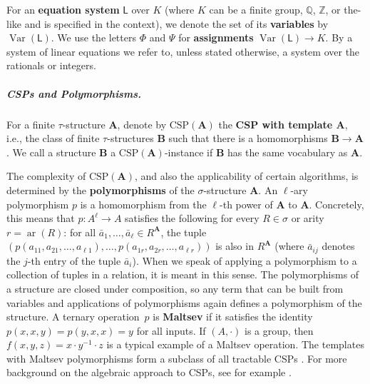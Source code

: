 \documentclass[a4paper,english, thm-restate]{lipics-v2021}
\newcommand{\ZZ}{\mathbb{Z}}
\newcommand{\QQ}{\mathbb{Q}}
\newcommand{\defining}[1]{\textbf{#1}}
\newcommand{\sig}{\tau}
\newcommand{\arity}[1]{\operatorname*{ar}(#1)}
\newcommand{\StructA}{\mathbf{A}}
\newcommand{\StructB}{\mathbf{B}}
\newcommand{\CSP}[1]{\mathrm{CSP}(#1)}
\newcommand{\leqs}{\mathsf{L}}
\newcommand{\Var}[1]{\operatorname*{Var}(#1)}
\begin{document}
	For an \defining{equation system} $\leqs$ over $K$ (where $K$ can be a finite group, $\QQ$, $\ZZ$, or the-like and is specified in the context),
	we denote the set of its \defining{variables} by $\Var{\leqs}$.
	We use the letters $\Phi$ and $\Psi$
	for \defining{assignments} $\Var{\leqs} \to K$.
	By a system of linear equations we refer to,
	unless stated otherwise,
	a system over the rationals or integers.
	
	
	
	
	
	\subparagraph{CSPs and Polymorphisms.}
	For a finite $\sig$-structure $\StructA$, denote by $\CSP{\StructA}$
	the \defining{CSP with template $\StructA$}, i.e., the class of finite $\sig$-structures $\StructB$
	such that there is a homomorphisms $\StructB \to \StructA$.
	We call a structure $\StructB$ a $\CSP{\StructA}$-instance
	if $\StructB$ has the same vocabulary as $\StructA$.
	
	The complexity of $\CSP{\StructA}$, and also the applicability of certain algorithms, is determined by the \defining{polymorphisms} of the $\sigma$-structure $\StructA$. An $\ell$-ary polymorphism $p$ is a homomorphism from the $\ell$-th power of $\StructA$ to $\StructA$. Concretely, this means that $p\colon A^{\ell} \to A$ satisfies the following for every $R \in \sigma$
	or arity $r=\arity{R}$: 
	for all $\bar{a}_1,\dots,\bar{a}_\ell \in R^{\StructA}$,
	the tuple $(p(a_{11}, a_{21}, \dots, a_{\ell1}), \dots, p(a_{1r}, a_{2r}, \dots, a_{\ell r}))$ is also in $R^{\StructA}$ (where $\bar{a}_{ij}$ denotes the $j$-th entry of the tuple $\bar{a}_i$). When we speak of applying a polymorphism to a collection of tuples in a relation, it is meant in this sense.
	The polymorphisms of a structure are closed under composition, so any term that can be built from variables and applications of polymorphisms again defines a polymorphism of the structure. 
	A ternary operation~$p$ is \defining{Maltsev} if it satisfies the identity $p(x,x,y) = p(y,x,x) = y$ for all inputs. 
	If $(A,\cdot)$ is a group, then $f(x,y,z) = x \cdot y^{-1} \cdot z$ is a typical example of a Maltsev operation.
	The templates with Maltsev polymorphisms form a subclass of all tractable CSPs \cite{BulatovDalmau2006}. 
	For more background on the algebraic approach to CSPs, see for example \cite{BartoKrokhinRoss}.
	
	
	
	
	
	
	
	
	
	
	
\end{document}
